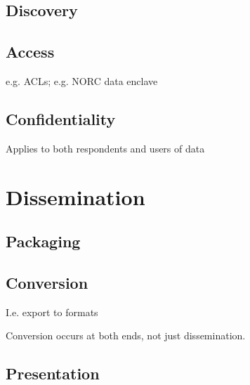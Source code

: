 \section{Discovery}
\label{sect:discovery}

\section{Access}
\label{sect:access}

e.g. ACLs; e.g. NORC data enclave

\section{Confidentiality}
\label{sect:confidentiality}

Applies to both respondents and users of data

\chapter{Dissemination}

\section{Packaging}
\label{sect:datapkg}

\section{Conversion}
\label{sect:conversion}

I.e. export to formats

Conversion occurs at both ends, not just dissemination.

\section{Presentation}
\label{sect:datapresentation}

